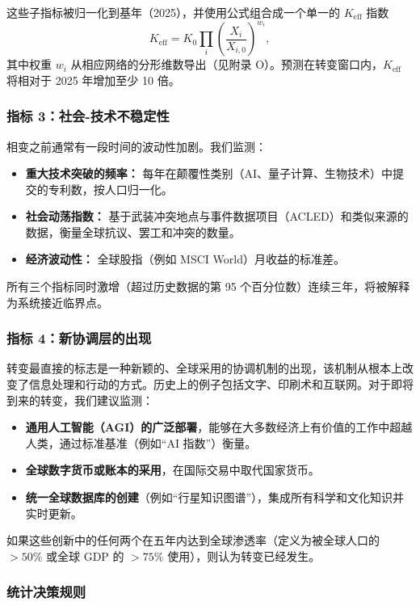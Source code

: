 \documentclass[12pt,a4paper]{article}
\theoremstyle{remark}
\begin{document}
		这些子指标被归一化到基年（2025），并使用公式组合成一个单一的 $K_{\text{eff}}$ 指数
		\[
		K_{\text{eff}} = K_0 \prod_{i} \left(\frac{X_i}{X_{i,0}}\right)^{w_i},
		\]
		其中权重 $w_i$ 从相应网络的分形维数导出（见附录 O）。预测在转变窗口内，$K_{\text{eff}}$ 将相对于 2025 年增加至少 10 倍。
		
		\subsubsection{指标 3：社会-技术不稳定性}
		
		相变之前通常有一段时间的波动性加剧。我们监测：
		
		\begin{itemize}
			\item \textbf{重大技术突破的频率：} 每年在颠覆性类别（AI、量子计算、生物技术）中提交的专利数，按人口归一化。
			\item \textbf{社会动荡指数：} 基于武装冲突地点与事件数据项目（ACLED）和类似来源的数据，衡量全球抗议、罢工和冲突的数量。
			\item \textbf{经济波动性：} 全球股指（例如 MSCI World）月收益的标准差。
		\end{itemize}
		
		所有三个指标同时激增（超过历史数据的第 95 个百分位数）连续三年，将被解释为系统接近临界点。
		
		\subsubsection{指标 4：新协调层的出现}
		
		转变最直接的标志是一种新颖的、全球采用的协调机制的出现，该机制从根本上改变了信息处理和行动的方式。历史上的例子包括文字、印刷术和互联网。对于即将到来的转变，我们建议监测：
		
		\begin{itemize}
			\item \textbf{通用人工智能（AGI）的广泛部署}，能够在大多数经济上有价值的工作中超越人类，通过标准基准（例如“AI 指数”）衡量。
			\item \textbf{全球数字货币或账本的采用}，在国际交易中取代国家货币。
			\item \textbf{统一全球数据库的创建}（例如“行星知识图谱”），集成所有科学和文化知识并实时更新。
		\end{itemize}
		
		如果这些创新中的任何两个在五年内达到全球渗透率（定义为被全球人口的 $>50\%$ 或全球 GDP 的 $>75\%$ 使用），则认为转变已经发生。
		
		\subsubsection{统计决策规则}
		
\end{document}
